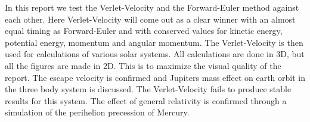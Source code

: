 In this report we test the Verlet-Velocity and the Forward-Euler method against each other. Here Verlet-Velocity will come out as a clear winner with an almost equal timing as Forward-Euler and with conserved values for kinetic energy, potential energy, momentum and angular momentum. The Verlet-Velocity is then used for calculations of various solar systems. All calculations are done in 3D, but all the figures are made in 2D. This is to maximize the visual quality of the report. The escape velocity is confirmed and Jupiters mass effect on earth orbit in the three body system is discussed. The Verlet-Velocity fails to produce stable results for this system. The effect of general relativity is confirmed through a simulation of the perihelion precession of Mercury. 
